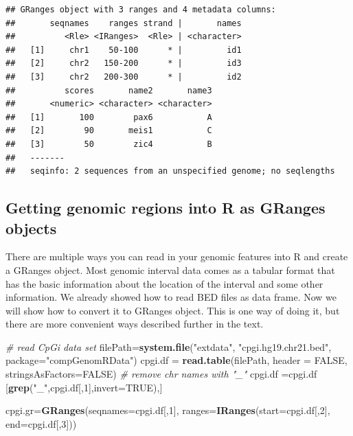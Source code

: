 \documentclass[12pt,]{krantz}
\newenvironment{Shaded}{\begin{snugshade}}{\end{snugshade}}
\newcommand{\CommentTok}[1]{\textcolor[rgb]{0.56,0.35,0.01}{\textit{#1}}}
\newcommand{\DataTypeTok}[1]{\textcolor[rgb]{0.13,0.29,0.53}{#1}}
\newcommand{\DecValTok}[1]{\textcolor[rgb]{0.00,0.00,0.81}{#1}}
\newcommand{\KeywordTok}[1]{\textcolor[rgb]{0.13,0.29,0.53}{\textbf{#1}}}
\newcommand{\NormalTok}[1]{#1}
\newcommand{\OtherTok}[1]{\textcolor[rgb]{0.56,0.35,0.01}{#1}}
\newcommand{\StringTok}[1]{\textcolor[rgb]{0.31,0.60,0.02}{#1}}
\begin{document}
\begin{verbatim}
## GRanges object with 3 ranges and 4 metadata columns:
##       seqnames    ranges strand |       names
##          <Rle> <IRanges>  <Rle> | <character>
##   [1]     chr1    50-100      * |         id1
##   [2]     chr2   150-200      * |         id3
##   [3]     chr2   200-300      * |         id2
##          scores       name2       name3
##       <numeric> <character> <character>
##   [1]       100        pax6           A
##   [2]        90       meis1           C
##   [3]        50        zic4           B
##   -------
##   seqinfo: 2 sequences from an unspecified genome; no seqlengths
\end{verbatim}

\hypertarget{getting-genomic-regions-into-r-as-granges-objects}{%
\subsection{Getting genomic regions into R as GRanges objects}\label{getting-genomic-regions-into-r-as-granges-objects}}

There are multiple ways you can read in your genomic features into R and create a GRanges object. Most genomic interval data comes as a tabular format that has the basic information about the location of the interval and some other information. We already showed how to read BED files as data frame. Now we will show how to convert it to GRanges object. This is one way of doing it, but there are more convenient ways described further in the text.

\begin{Shaded}
\begin{Highlighting}[]
\CommentTok{# read CpGi data set}
\NormalTok{filePath=}\KeywordTok{system.file}\NormalTok{(}\StringTok{"extdata"}\NormalTok{,}
                      \StringTok{"cpgi.hg19.chr21.bed"}\NormalTok{,}
                      \DataTypeTok{package=}\StringTok{"compGenomRData"}\NormalTok{)}
\NormalTok{cpgi.df =}\StringTok{ }\KeywordTok{read.table}\NormalTok{(filePath, }\DataTypeTok{header =} \OtherTok{FALSE}\NormalTok{,}
                     \DataTypeTok{stringsAsFactors=}\OtherTok{FALSE}\NormalTok{) }
\CommentTok{# remove chr names with "_"}
\NormalTok{cpgi.df =cpgi.df [}\KeywordTok{grep}\NormalTok{(}\StringTok{"_"}\NormalTok{,cpgi.df[,}\DecValTok{1}\NormalTok{],}\DataTypeTok{invert=}\OtherTok{TRUE}\NormalTok{),]}

\NormalTok{cpgi.gr=}\KeywordTok{GRanges}\NormalTok{(}\DataTypeTok{seqnames=}\NormalTok{cpgi.df[,}\DecValTok{1}\NormalTok{],}
                \DataTypeTok{ranges=}\KeywordTok{IRanges}\NormalTok{(}\DataTypeTok{start=}\NormalTok{cpgi.df[,}\DecValTok{2}\NormalTok{],}
                              \DataTypeTok{end=}\NormalTok{cpgi.df[,}\DecValTok{3}\NormalTok{]))}
\end{Highlighting}
\end{Shaded}
\end{document}

